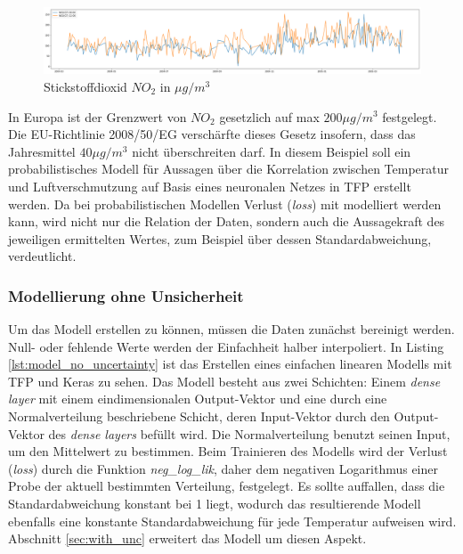 \documentclass[12pt]{article}
\begin{document}
\begin{figure}[h]
    \centering
    \includegraphics[width=1.0\textwidth]{./figs/no2.png}
    \caption{Stickstoffdioxid $NO_2$ in ${\mu g/m^3}$}
    \label{fig:no2}
\end{figure}

In Europa ist der Grenzwert von $NO_2$ gesetzlich auf max $200{\mu g/m^3}$ festgelegt. Die EU-Richtlinie 2008/50/EG verschärfte dieses Gesetz insofern, dass das Jahresmittel $40{\mu g/m^3}$ nicht überschreiten darf. In diesem Beispiel soll ein probabilistisches Modell für Aussagen über die Korrelation zwischen Temperatur und Luftverschmutzung auf Basis eines neuronalen Netzes in TFP erstellt werden. Da bei probabilistischen Modellen Verlust (\textit{loss}) mit modelliert werden kann, wird nicht nur die Relation der Daten, sondern auch die Aussagekraft des jeweiligen ermittelten Wertes, zum Beispiel über dessen Standardabweichung, verdeutlicht.

\subsubsection{Modellierung ohne Unsicherheit}
\label{sec:no_unc}

Um das Modell erstellen zu können, müssen die Daten zunächst bereinigt werden. Null- oder fehlende Werte werden der Einfachheit halber interpoliert. In Listing \ref{lst:model_no_uncertainty} ist das Erstellen eines einfachen linearen Modells mit TFP und Keras zu sehen. Das Modell besteht aus zwei Schichten: Einem \textit{dense layer} mit einem eindimensionalen Output-Vektor und eine durch eine Normalverteilung beschriebene Schicht, deren Input-Vektor durch den Output-Vektor des \textit{dense layers} befüllt wird. Die Normalverteilung benutzt seinen Input, um den Mittelwert zu bestimmen. Beim Trainieren des Modells wird der Verlust (\textit{loss}) durch die Funktion \textit{neg\_log\_lik}, daher dem negativen Logarithmus einer Probe der aktuell bestimmten Verteilung, festgelegt. Es sollte auffallen, dass die Standardabweichung konstant bei 1 liegt, wodurch das resultierende Modell ebenfalls eine konstante Standardabweichung für jede Temperatur aufweisen wird. Abschnitt \ref{sec:with_unc} erweitert das Modell um diesen Aspekt.
\end{document}

